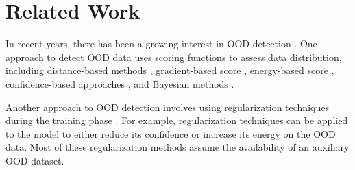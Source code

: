 \documentclass[10pt]{article} %
\theoremstyle{plain}
\theoremstyle{definition}
\begin{document}
\section{Related Work}
In recent years, there has been a growing interest in OOD detection \citep{fort2021exploring, yang2024generalized, NEURIPS2022_f0e91b13, NEURIPS2022_82b0c1b9, yang2022openood, NEURIPS2022_ec14daa5, galil2023a, djurisic2023extremely, tao2023nonparametric, zheng2023out, wang2022watermarking, wang2023outofdistribution, uppaal-etal-2023-fine, zhu2023diversified, bai2023feed, ming2024does, zhang2023openood, ghosal2024overcome, abbas2025outofdistribution}. 
One approach to detect OOD data uses scoring functions to assess data distribution, including distance-based methods \citep{NEURIPS2018_abdeb6f5, NEURIPS2020_8965f766, ren2021simple, sehwag2021ssd, sun2022out, NEURIPS2022_804dbf8d, ming2023how, ren2022out}, gradient-based score \citep{huang2021importance}, energy-based score \citep{NEURIPS2020_f5496252, wang2021can, wu2023energybased}, confidence-based approaches \citep{bendale2016towards, hendrycks2017a, liang2018enhancing}, and Bayesian methods \citep{pmlr-v48-gal16, NIPS2017_9ef2ed4b, NEURIPS2019_118921ef, NEURIPS2019_7dd2ae7d, Wen2020BatchEnsemble, kristiadi2020being}. 

Another approach to OOD detection involves using regularization techniques during the training phase \citep{NEURIPS2018_3ea2db50, pmlr-v97-geifman19a, hein2019relu, Meinke2020Towards, NEURIPS2020_28e209b6, NEURIPS2020_543e8374, van2020uncertainty, yang2021semantically, pmlr-v162-wei22d, du2022unknown, NEURIPS2023_bf5311df, NEURIPS2023_e812af67}.
For example, regularization techniques can be applied to the model to either reduce its confidence \citep{lee2017training, hendrycks2018deep} or increase its energy \citep{NEURIPS2020_f5496252, du2022towards, pmlr-v162-ming22a} on the OOD data.
Most of these regularization methods assume the availability of an auxiliary OOD dataset.  
\end{document}
